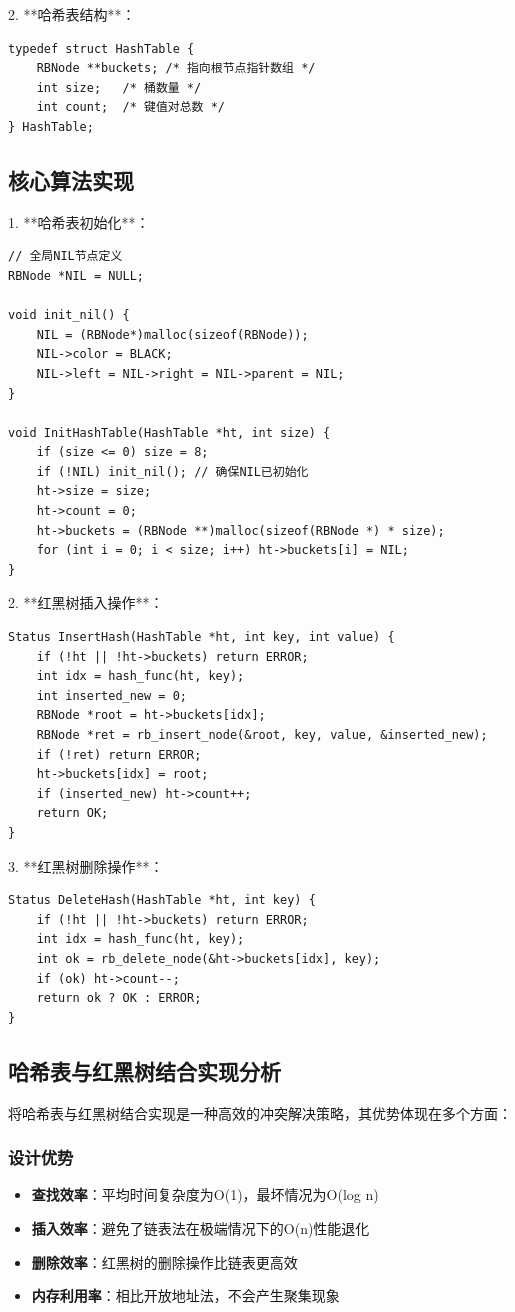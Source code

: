 \documentclass[12pt,a4paper]{article}
\begin{document}
2. **哈希表结构**：
\begin{lstlisting}
typedef struct HashTable {
    RBNode **buckets; /* 指向根节点指针数组 */
    int size;   /* 桶数量 */
    int count;  /* 键值对总数 */
} HashTable;
\end{lstlisting}

\subsection{核心算法实现}
1. **哈希表初始化**：
\begin{lstlisting}
// 全局NIL节点定义
RBNode *NIL = NULL;

void init_nil() {
    NIL = (RBNode*)malloc(sizeof(RBNode));
    NIL->color = BLACK;
    NIL->left = NIL->right = NIL->parent = NIL;
}

void InitHashTable(HashTable *ht, int size) {
    if (size <= 0) size = 8;
    if (!NIL) init_nil(); // 确保NIL已初始化
    ht->size = size;
    ht->count = 0;
    ht->buckets = (RBNode **)malloc(sizeof(RBNode *) * size);
    for (int i = 0; i < size; i++) ht->buckets[i] = NIL;
}
\end{lstlisting}

2. **红黑树插入操作**：
\begin{lstlisting}
Status InsertHash(HashTable *ht, int key, int value) {
    if (!ht || !ht->buckets) return ERROR;
    int idx = hash_func(ht, key);
    int inserted_new = 0;
    RBNode *root = ht->buckets[idx];
    RBNode *ret = rb_insert_node(&root, key, value, &inserted_new);
    if (!ret) return ERROR;
    ht->buckets[idx] = root;
    if (inserted_new) ht->count++;
    return OK;
}
\end{lstlisting}

3. **红黑树删除操作**：
\begin{lstlisting}
Status DeleteHash(HashTable *ht, int key) {
    if (!ht || !ht->buckets) return ERROR;
    int idx = hash_func(ht, key);
    int ok = rb_delete_node(&ht->buckets[idx], key);
    if (ok) ht->count--;
    return ok ? OK : ERROR;
}
\end{lstlisting}

\subsection{哈希表与红黑树结合实现分析}
将哈希表与红黑树结合实现是一种高效的冲突解决策略，其优势体现在多个方面：

\subsubsection{设计优势}
\begin{itemize}
\item \textbf{查找效率}：平均时间复杂度为O(1)，最坏情况为O(log n)
\item \textbf{插入效率}：避免了链表法在极端情况下的O(n)性能退化
\item \textbf{删除效率}：红黑树的删除操作比链表更高效
\item \textbf{内存利用率}：相比开放地址法，不会产生聚集现象
\end{itemize}
\end{document}
